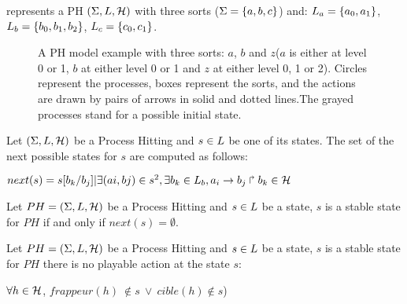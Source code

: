 \begin{example*}
 represents a PH $(\Sigma,L,\mathcal{H})$ with three sorts
($\Sigma = \{a, b, c\}$) and:
$L_a = \{a_0, a_1\}$,
$L_b = \{b_0, b_1, b_2\}$,
$L_c = \{c_0, c_1\}$.
\begin{figure}[ht]
\centering
{}
\caption{\label{fig:ph} 
A PH model example with three sorts: $a$, $b$ and $z$($a$ is either at level 0 or 1, $b$ at either level 0 or 1 and $z$ at either level 0, 1 or 2).
Circles represent the processes, boxes represent the sorts, and the actions are drawn by pairs of arrows in solid and dotted lines.The grayed processes stand for a possible initial state.
}
\end{figure}

\end{example*}

\begin{definition}
\label{def:NextState}
Let $(\Sigma,L,\mathcal{H})$ be a Process Hitting and $s \in L$ be
one of its states. The set of the next possible states for $s$ are computed as follows:
\begin{center}
$next(s) = {s[b_k /b_j ]| \exists (a i , b j ) \in s^2 , \exists b_k \in L_b , a_i\rightarrow b_j\Rsh b_k \in \mathcal{H}}$
\end{center}

\end{definition}

\begin{definition}
\label{def:FixPoint1}
Let $PH = (\Sigma,L,\mathcal{H})$ be a Process Hitting and
$s \in L$ be a state, $s$ is a stable state for $PH$ if and only if $next(s) = \emptyset $.
\end{definition}
\begin{definition}
\label{def:FixPoint2}
Let $PH = (\Sigma,L,\mathcal{H})$ be a Process Hitting and
$s \in L$ be a state, $s$ is a stable state for $PH$ there is no playable action at the state $s$: 
\begin{center}
$\forall h \in \mathcal{H}$, $frappeur(h) ~ \notin s ~ \vee ~ cible(h) \notin s$)
\end{center}
\end{definition}

